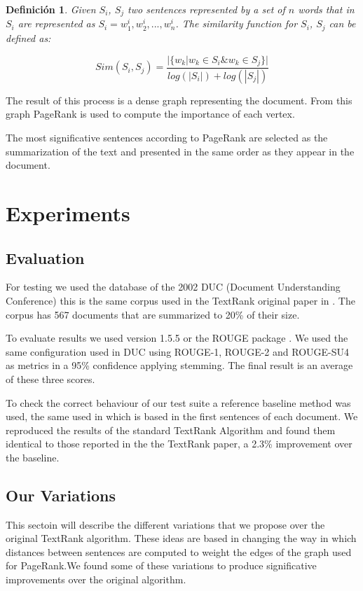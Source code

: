 \documentclass{llncs}
\newtheorem{definicion}{Definición}
\begin{document}
\begin{definicion}
Given $S_i$, $S_j$ two sentences represented by a set of $n$ words that in 
$S_i$ are represented as $S_i = w_{1}^{i}, w_{2}^{i},..., w_{n}^{i}$. The similarity function for $S_i$, $S_j$ can be defined as:


\begin{equation}
Sim(S_{i},S_{j}) = \frac{ | \{   w_{k} | w_{k} \in S_{i} \& w_{k} \in S_{j}   \}  | }    
                              {  log(|S_{i}|) + log(|S_{j}|)  }
\end{equation}


\end{definicion}

The result of this process is a dense graph representing the document. From this graph PageRank is used to compute the importance of each vertex. 

The most significative sentences according to PageRank are selected as the summarization of the text and presented in the same order as they appear in the document.
\section{Experiments}

\subsection{Evaluation}
For testing we used the database of the 2002 DUC (Document Understanding Conference) \cite{duc2002-guidelines} this is the same corpus used in the TextRank original paper in \cite{mihalcea-tarau}. The corpus has 567 documents that are summarized to 20\% of their size.

To evaluate results we used version 1.5.5 or the ROUGE package \cite{Lin2004a}. We used the same configuration used in DUC using ROUGE-1, ROUGE-2 and ROUGE-SU4 as metrics in a 95\% confidence applying stemming. The final result is an average of these three scores.

To check the correct behaviour of our test suite a reference baseline method was used, the same used in \cite{mihalcea-tarau} which is based in the first sentences of each document. We reproduced the results of the standard TextRank Algorithm and found them identical to those reported in the the TextRank paper, a 2.3\% improvement over the baseline.


\subsection{Our Variations}
This sectoin will describe the different variations that we propose over the original TextRank algorithm. These ideas are based in changing the way in which distances between sentences are computed to weight the edges of the graph used for PageRank.We found some of these variations to produce significative improvements over the original algorithm.
\end{document}
